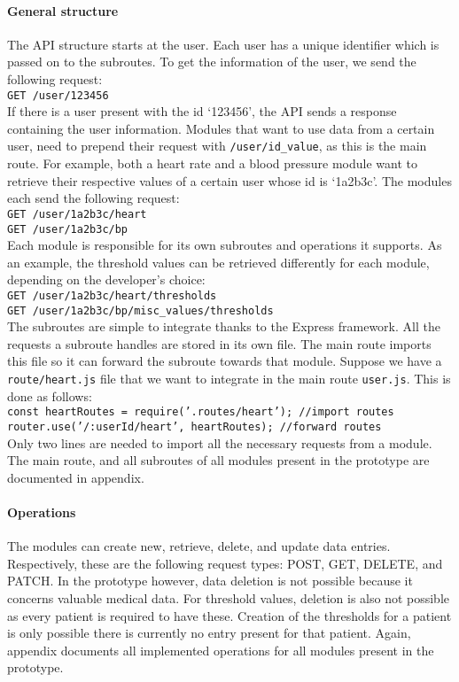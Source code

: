         \paragraph{General structure} The API structure starts at the user. Each user has a unique identifier which is passed on to the subroutes. To get the information of the user, we send the following request:\\
            \tab\texttt{GET /user/123456}\\
        If there is a user present with the id `123456', the API sends a response containing the user information. Modules that want to use data from a certain user, need to prepend their request with \texttt{/user/id\_value}, as this is the main route. For example, both a heart rate and a blood pressure module want to retrieve their respective values of a certain user whose id is `1a2b3c'. The modules each send the following request:\\
            \tab\texttt{GET /user/1a2b3c/heart}\\
            \tab\texttt{GET /user/1a2b3c/bp}\\
        Each module is responsible for its own subroutes and operations it supports. As an example, the threshold values can be retrieved differently for each module, depending on the developer's choice:\\
            \tab\texttt{GET /user/1a2b3c/heart/thresholds}\\
            \tab\texttt{GET /user/1a2b3c/bp/misc\_values/thresholds}\\
        The subroutes are simple to integrate thanks to the Express framework. All the requests a subroute handles are stored in its own file. The main route imports this file so it can forward the subroute towards that module. Suppose we have a \texttt{route/heart.js} file that we want to integrate in the main route \texttt{user.js}. This is done as follows:\\
            \tabsmall\texttt{const heartRoutes = require('.routes/heart'); //import routes}\\ %
            \tabsmall\texttt{router.use('/:userId/heart', heartRoutes); //forward routes}\\ %
        Only two lines are needed to import all the necessary requests from a module. The main route, and all subroutes of all modules present in the prototype are documented in appendix.

        \paragraph{Operations}
        The modules can create new, retrieve, delete, and update data entries. Respectively, these are the following request types: POST, GET, DELETE, and PATCH\@. In the prototype however, data deletion is not possible because it concerns valuable medical data. For threshold values, deletion is also not possible as every patient is required to have these. Creation of the thresholds for a patient is only possible there is currently no entry present for that patient. Again, appendix documents all implemented operations for all modules present in the prototype.

